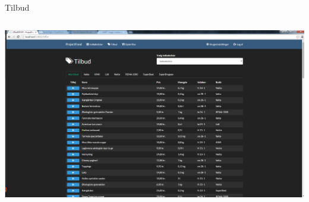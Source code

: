 \begin{frame}{Tilbud}

	
	\begin{minipage}[0.3\textheight]{\textwidth}
	\begin{columns}[T]
	\begin{column}{1\textwidth}
	 \includegraphics[width=1\textwidth,height=1\textheight,keepaspectratio, trim={1cm 0 0 16mm}, clip]{images/Screenshots/OffersOld.png}
	
	\end{column}

	\end{columns}

  \end{minipage}
	
\end{frame}

